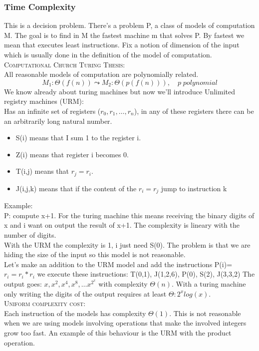 \subsubsection*{Time Complexity}
This is a decision problem. There's a problem P, a class of models of computation M. The goal is to find in M the fastest machine m that solves P. By fastest we mean that executes least instructions. Fix a notion of dimension of the input which is usually done in the definition of the model of computation.\\
\textsc{Computational Church Turing Thesis:}\\
All reasonable models of computation are polynomially related. 
$$M_1: \Theta(f(n)) \leadsto M_2: \Theta (p(f(n))), \quad p \; polynomial$$
We know already about turing machines but now we'll introduce Unlimited registry machines (URM):\\
Has an infinite set of registers ($r_0, r_1, \ldots, r_n$), in any of these registers there can be an arbitrarily long natural number.
\begin{itemize}
    \item S(i) means that I sum 1 to the register i.
    \item Z(i) means that register i becomes 0.
    \item T(i,j) means that $r_j = r_i$.
    \item J(i,j,k) means that if the content of the $r_i = r_j$ jump to instruction k
\end{itemize}
Example:\\
P: compute x+1. For the turing machine this means receiving the binary digits of x and i want on output the result of x+1. The complexity is lineary with the number of digits.\\
With the URM the complexity is 1, i just need S(0). The problem is that we are hiding the size of the input so this model is not reasonable.\\
Let's make an addition to the URM model and add the instructions P(i)= $r_i = r_i*r_i$ we execute these instructions:
T(0,1), J(1,2,6), P(0), S(2), J(3,3,2) The output goes: $x, x^2, x^4, x^8, \ldots x^{2^x}$ with complexity $\Theta(n)$. With a turing machine only writing the digits of the output requires at least $\Theta: 2^xlog(x)$.\\
\textsc{Uniform complexity cost}:\\
Each instruction of the models has complexity $\Theta(1)$. This is not reasonable when we are using models involving operations that make the involved integers grow too fast. An example of this behaviour is the URM with the product operation.\\
